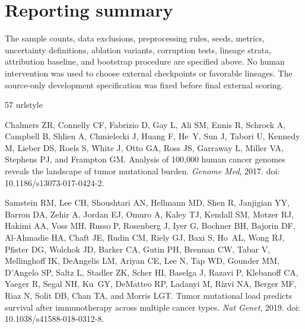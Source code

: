 \documentclass[11pt]{article}
\begin{document}
\section{Reporting summary}
The sample counts, data exclusions, preprocessing rules, seeds, metrics, uncertainty definitions, ablation variants, corruption tests, lineage strata, attribution baseline, and bootstrap procedure are specified above. No human intervention was used to choose external checkpoints or favorable lineages. The source-only development specification was fixed before final external scoring.

\begin{thebibliography}{57}
\providecommand{\natexlab}[1]{#1}
\providecommand{\url}[1]{\texttt{#1}}
\expandafter\ifx\csname urlstyle\endcsname\relax
  \providecommand{\doi}[1]{doi: #1}\else
  \providecommand{\doi}{doi: \begingroup \urlstyle{rm}\Url}\fi

Chalmers ZR, Connelly CF, Fabrizio D, Gay L, Ali SM, Ennis R, Schrock A,
  Campbell B, Shlien A, Chmielecki J, Huang F, He~Y, Sun J, Tabori U, Kennedy
  M, Lieber DS, Roels S, White J, Otto GA, Ross JS, Garraway L, Miller VA,
  Stephens PJ, and Frampton GM.
\newblock Analysis of 100,000 human cancer genomes reveals the landscape of
  tumor mutational burden.
\newblock \emph{Genome Med}, 2017.
\newblock \doi{10.1186/s13073-017-0424-2}.

Samstein RM, Lee CH, Shoushtari AN, Hellmann MD, Shen R, Janjigian YY, Barron
  DA, Zehir A, Jordan EJ, Omuro A, Kaley TJ, Kendall SM, Motzer RJ, Hakimi AA,
  Voss MH, Russo P, Rosenberg J, Iyer G, Bochner BH, Bajorin DF, Al-Ahmadie HA,
  Chaft JE, Rudin CM, Riely GJ, Baxi S, Ho~AL, Wong RJ, Pfister DG, Wolchok JD,
  Barker CA, Gutin PH, Brennan CW, Tabar V, Mellinghoff IK, DeAngelis LM,
  Ariyan CE, Lee N, Tap WD, Gounder MM, D'Angelo SP, Saltz L, Stadler ZK, Scher
  HI, Baselga J, Razavi P, Klebanoff CA, Yaeger R, Segal NH, Ku~GY, DeMatteo
  RP, Ladanyi M, Rizvi NA, Berger MF, Riaz N, Solit DB, Chan TA, and Morris
  LGT.
\newblock Tumor mutational load predicts survival after immunotherapy across
  multiple cancer types.
\newblock \emph{Nat Genet}, 2019.
\newblock \doi{10.1038/s41588-018-0312-8}.


\end{thebibliography}
\end{document}
